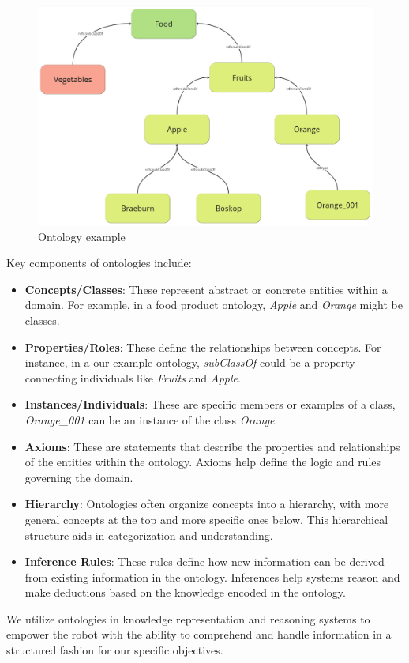    \begin{figure}[H]
        \includegraphics[scale=0.27]{Graphics/ontology.jpg}
		\caption{Ontology example}
    \end{figure}
	Key components of ontologies include:

	\begin{itemize}
		\item \textbf{Concepts/Classes}: These represent abstract or concrete entities within a domain. For example, in a food product ontology, \textit{Apple} and \textit{Orange} might be classes.
		\item \textbf{Properties/Roles}: These define the relationships between concepts. For instance, in a our example ontology, \textit{subClassOf} could be a property connecting individuals like \textit{Fruits} and \textit{Apple}.
		\item \textbf{Instances/Individuals}: These are specific members or examples of a class, \textit{Orange\_001} can be an instance of the class \textit{Orange}.
		\item \textbf{Axioms}: These are statements that describe the properties and relationships of the entities within the ontology. Axioms help define the logic and rules governing the domain.
		\item \textbf{Hierarchy}: Ontologies often organize concepts into a hierarchy, with more general concepts at the top and more specific ones below. This hierarchical structure aids in categorization and understanding.
		\item \textbf{Inference Rules}: These rules define how new information can be derived from existing information in the ontology. Inferences help systems reason and make deductions based on the knowledge encoded in the ontology.
	\end{itemize}
	We utilize ontologies in knowledge representation and reasoning systems to empower the robot with the ability to comprehend and handle information in a structured fashion for our specific objectives.

